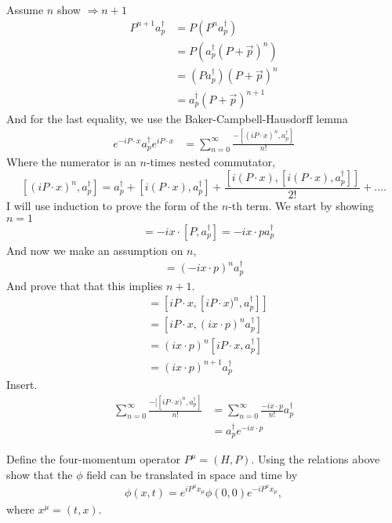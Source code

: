 \documentclass[working, oneside]{../../Preambles/tuftebook}
\begin{document}
\begin{solution}
Assume $n$ show $\Rightarrow n+1$
\begin{align*}
P^{n+1} a_p^\dagger &= P (P^n a_p^\dagger) \\
&= P (a_p^\dagger (P + \vec{p})^n) \\
&= (P a_p^\dagger) (P + \vec{p})^n \\
&= a_p^\dagger (P + \vec{p})^{n+1}
\end{align*}
And for the last equality, we use the Baker-Campbell-Hausdorff lemma
\begin{align*}
e^{-i P \cdot x} a_p^\dagger e^{i P \cdot x} &= \sum_{n=0}^\infty \frac{- [\left( iP\cdot x \right)^{n} , a_p^\dagger] }{n!} 
\end{align*}
Where the numerator is an $n$-times nested commutator,
\[
\left[ \left( iP\cdot x \right) ^{n}, a_{p}^\dagger \right] = a_p^\dagger + [i(P \cdot x), a_p^\dagger] + \frac{ [i(P \cdot x), [i(P \cdot x), a_p^\dagger]] }{2!} + \dots
.\] 
I will use induction to prove the form of the $n$-th term. We start by showing $n=1$
\begin{align*}
[i(P \cdot x), a_p^\dagger] &= -i x \cdot [P, a_p^\dagger] = -i x \cdot p a_p^\dagger
\end{align*}
And now we make an assumption on $n$,
\begin{align*}
[i(P \cdot x)^{n}, a_p^\dagger]= (-i x \cdot p)^n a_p^\dagger
\end{align*}
And prove that that this implies $n+1$.
\begin{align*}
[[i P \cdot x)^{n+1}, a_p^\dagger] &= [i P \cdot x, [i P \cdot x)^n, a_p^\dagger]] \\
&= [i P \cdot x, (ix \cdot p)^n a_p^\dagger] \\
&= (ix \cdot p)^n [i P \cdot x, a_p^\dagger] \\
&= (ix \cdot p)^{n+1} a_p^\dagger
\end{align*}
Insert.
\begin{align*}
\sum_{n=0}^\infty \frac{-[[i P \cdot x)^n, a_p^\dagger]}{n!} &= \sum_{n=0}^\infty \frac{-i x \cdot p}{n!} a_p^\dagger \\
&= a_p^\dagger e^{-ix \cdot p}
\end{align*}
\end{solution}
\begin{exercise}[12]
Define the four-momentum operator $P^\mu = (H, P)$. Using the relations above show that the $\phi$ field can be translated in space and time by
\begin{align*}
\phi(x,t) = e^{i P^\mu x_\mu} \phi(0,0) e^{-i P^\mu x_\mu},
\end{align*}
where $x^\mu = (t, x)$.
\end{exercise}
\end{document}
